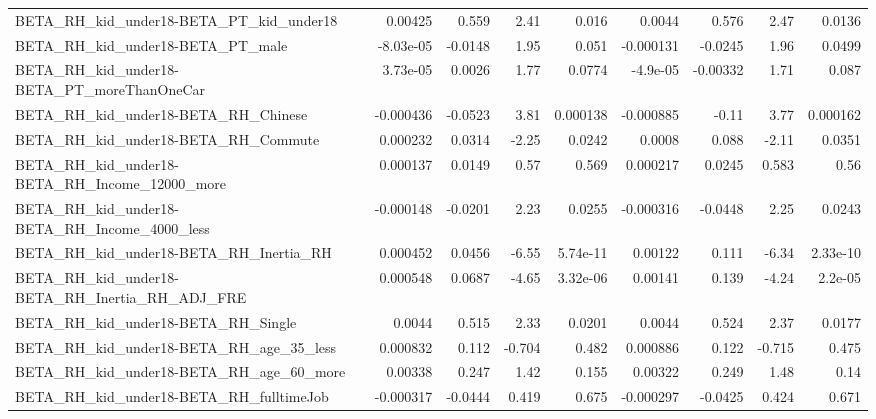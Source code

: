 \begin{tabular}{lrrrrrrrr}
BETA\_RH\_kid\_under18-BETA\_PT\_kid\_under18            &     0.00425 &        0.559 &     2.41 &    0.016 &     0.0044 &       0.576 &         2.47 &        0.0136 \\
BETA\_RH\_kid\_under18-BETA\_PT\_male                   &   -8.03e-05 &      -0.0148 &     1.95 &    0.051 &  -0.000131 &     -0.0245 &         1.96 &        0.0499 \\
BETA\_RH\_kid\_under18-BETA\_PT\_moreThanOneCar         &    3.73e-05 &       0.0026 &     1.77 &   0.0774 &   -4.9e-05 &    -0.00332 &         1.71 &         0.087 \\
BETA\_RH\_kid\_under18-BETA\_RH\_Chinese                &   -0.000436 &      -0.0523 &     3.81 & 0.000138 &  -0.000885 &       -0.11 &         3.77 &      0.000162 \\
BETA\_RH\_kid\_under18-BETA\_RH\_Commute                &    0.000232 &       0.0314 &    -2.25 &   0.0242 &     0.0008 &       0.088 &        -2.11 &        0.0351 \\
BETA\_RH\_kid\_under18-BETA\_RH\_Income\_12000\_more      &    0.000137 &       0.0149 &     0.57 &    0.569 &   0.000217 &      0.0245 &        0.583 &          0.56 \\
BETA\_RH\_kid\_under18-BETA\_RH\_Income\_4000\_less       &   -0.000148 &      -0.0201 &     2.23 &   0.0255 &  -0.000316 &     -0.0448 &         2.25 &        0.0243 \\
BETA\_RH\_kid\_under18-BETA\_RH\_Inertia\_RH             &    0.000452 &       0.0456 &    -6.55 & 5.74e-11 &    0.00122 &       0.111 &        -6.34 &      2.33e-10 \\
BETA\_RH\_kid\_under18-BETA\_RH\_Inertia\_RH\_ADJ\_FRE     &    0.000548 &       0.0687 &    -4.65 & 3.32e-06 &    0.00141 &       0.139 &        -4.24 &       2.2e-05 \\
BETA\_RH\_kid\_under18-BETA\_RH\_Single                 &      0.0044 &        0.515 &     2.33 &   0.0201 &     0.0044 &       0.524 &         2.37 &        0.0177 \\
BETA\_RH\_kid\_under18-BETA\_RH\_age\_35\_less            &    0.000832 &        0.112 &   -0.704 &    0.482 &   0.000886 &       0.122 &       -0.715 &         0.475 \\
BETA\_RH\_kid\_under18-BETA\_RH\_age\_60\_more            &     0.00338 &        0.247 &     1.42 &    0.155 &    0.00322 &       0.249 &         1.48 &          0.14 \\
BETA\_RH\_kid\_under18-BETA\_RH\_fulltimeJob            &   -0.000317 &      -0.0444 &    0.419 &    0.675 &  -0.000297 &     -0.0425 &        0.424 &         0.671 \\

\end{tabular}
